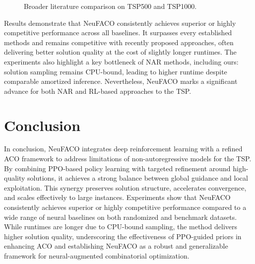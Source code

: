 \documentclass[a4paper,conference]{IEEEtran}
\begin{document}
\begin{figure}[!tb]
{\begin{tabular}{l ccc ccc}
\bottomrule[1pt]
\end{tabular}
}%

\caption{Broader literature comparison on TSP500 and TSP1000.}
\label{fig:tsp-results}
\end{figure}

Results demonstrate that NeuFACO consistently achieves superior or highly competitive performance across all baselines. It surpasses every established methods and remains competitive with recently proposed approaches, often delivering better solution quality at the cost of slightly longer runtimes. The experiments also highlight a key bottleneck of NAR methods, including ours: solution sampling remains CPU-bound, leading to higher runtime despite comparable amortized inference. Nevertheless, NeuFACO marks a significant advance for both NAR and RL-based approaches to the TSP.

\section{Conclusion}
In conclusion, NeuFACO integrates deep reinforcement learning with a refined ACO framework to address limitations of non-autoregressive models for the TSP. By combining PPO-based policy learning with targeted refinement around high-quality solutions, it achieves a strong balance between global guidance and local exploitation. This synergy preserves solution structure, accelerates convergence, and scales effectively to large instances. Experiments show that NeuFACO consistently achieves superior or highly competitive performance compared to a wide range of neural baselines on both randomized and benchmark datasets. While runtimes are longer due to CPU-bound sampling, the method delivers higher solution quality, underscoring the effectiveness of PPO-guided priors in enhancing ACO and establishing NeuFACO as a robust and generalizable framework for neural-augmented combinatorial optimization.




\end{document}
